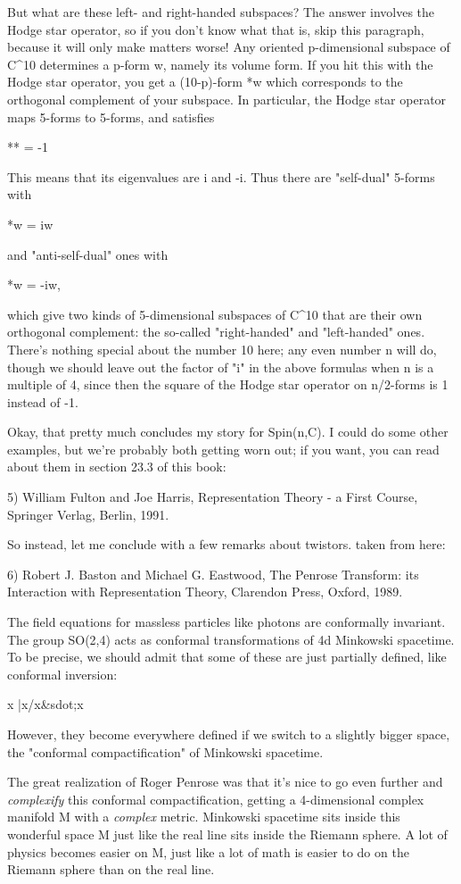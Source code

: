 But what are these left- and right-handed subspaces?  The answer involves
the Hodge star operator, so if you don't know what that is, skip this
paragraph, because it will only make matters worse!  Any oriented
p-dimensional subspace of C^{10} determines a p-form w, namely its
volume form.  If you hit this with the Hodge star operator, you get a
(10-p)-form *w which corresponds to the orthogonal complement of your
subspace.  In particular, the Hodge star operator maps 5-forms to
5-forms, and satisfies

** = -1

This means that its eigenvalues are i and -i.   Thus there are
"self-dual" 5-forms with 

*w = iw 

and "anti-self-dual" ones with 

*w = -iw,

which give two kinds of 5-dimensional subspaces of C^{10}
that are their
own orthogonal complement: the so-called "right-handed" 
and "left-handed" 
ones.  There's nothing special about the number 10 here; any even number 
n will do, though we should leave out the factor of "i" in the above 
formulas when n is a multiple of 4, since then the square of the Hodge 
star operator on n/2-forms is 1 instead of -1.

Okay, that pretty much concludes my story for Spin(n,C).  I could
do some other examples, but we're probably both getting worn out;
if you want, you can read about them in section 23.3 of this book:

5)  William Fulton and Joe Harris, Representation Theory - a First
Course, Springer Verlag, Berlin, 1991.

So instead, let me conclude with a few remarks about twistors.
taken from here:

6) Robert J. Baston and Michael G. Eastwood, The Penrose Transform:
its Interaction with Representation Theory, Clarendon Press, Oxford,
1989.

The field equations for massless particles like photons are conformally
invariant.  The group SO(2,4) acts as conformal transformations of 4d
Minkowski spacetime.  To be precise, we should admit that some of these
are just partially defined, like conformal inversion:

x |\to  x/x&sdot;x

However, they become everywhere defined if we switch to a slightly
bigger space, the "conformal compactification" of Minkowski spacetime.

The great realization of Roger Penrose was that it's nice to go even
further and \emph{complexify} this conformal compactification, getting a
4-dimensional complex manifold M with a \emph{complex} metric.  Minkowski
spacetime sits inside this wonderful space M just like the real line
sits inside the Riemann sphere.  A lot of physics becomes easier on M,
just like a lot of math is easier to do on the Riemann sphere than on
the real line.

